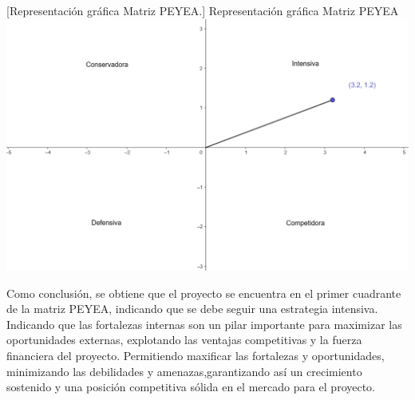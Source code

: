 \vspace{2mm}
\begin{minipage}{0.9\textwidth}
\centering
{}[{Representación gráfica Matriz PEYEA.}]{ Representación gráfica Matriz PEYEA }
\label{peyeagrafico}
\includegraphics[width=1\textwidth]{Content/Images/PEYEA.jpeg}
\end{minipage}

Como conclusión, se obtiene que el proyecto se encuentra en el primer cuadrante de la matriz PEYEA, indicando que se debe seguir una estrategia intensiva. Indicando que las fortalezas internas son un pilar importante para maximizar las oportunidades externas, explotando las ventajas competitivas y la fuerza financiera del proyecto. Permitiendo maxificar las fortalezas y oportunidades, minimizando las debilidades y amenazas,garantizando así un crecimiento sostenido y una posición competitiva sólida en el mercado para el proyecto.
